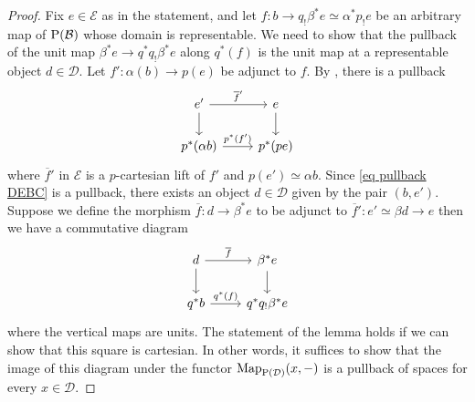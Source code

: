 \documentclass{amsart}
\numberwithin{theorem}{subsection}
\theoremstyle{definition}
\newcommand{\Map}{\operatorname{Map}}
\newcommand{\xE}{\mathcal{E}}
\newcommand{\Pre}{\name{P}}
\newcommand{\name}[1]{\ensuremath{\text{\textup{#1}}}}
\begin{document}
\begin{proof}
Fix $e\in \xE$ as in the statement, and let $f \colon b \to q_!\beta^*e \simeq \alpha^* p_! e$ be an arbitrary map of $\Pre(\mathcal{B})$ whose domain is representable. We need to show that the pullback of the unit map $\beta^*e \to q^*q_!\beta^*e$ along $q^*(f)$ is the unit map at a representable object $d\in \mathcal D$.
Let $f' \colon \alpha(b) \to p(e)$ be adjunct to $f$.
By \cite[Lemma 2.7.10]{ChuHaugseng}, there is a pullback 
\begin{equation}\label{dia simple}
 \begin{tikzcd}
e' \rar{\overline{f}'} \dar & e \dar \\
p^*(\alpha b) \rar{p^*(f')} & p^*(pe)
\end{tikzcd}
\end{equation}
where $\overline{f}'$ in $\xE$ is a $p$-cartesian lift of $f'$ and $p(e')\simeq \alpha b$.
Since \eqref{eq pullback DEBC} is a pullback, there exists an object $d\in \mathcal{D}$ given by the pair $(b,e')$. Suppose we define the morphism $\overline{f}\colon d\to \beta^* e$ to be adjunct to $\overline{f}'\colon e'\simeq \beta d\to e$ then we have a commutative diagram
\[ \begin{tikzcd}
d \rar{\overline f} \dar & \beta^* e \dar \\
q^*b \rar{q^*(f)} & q^*q_!\beta^*e
\end{tikzcd} \]
where the vertical maps are units. The statement of the lemma holds if we can show that this square is cartesian. In other words, it suffices to show that the image of this diagram under the functor $\Map_{\Pre(\mathcal{D})}(x,-)$ is a pullback of spaces for every $x\in \mathcal{D}$.


\end{proof}
\end{document}
